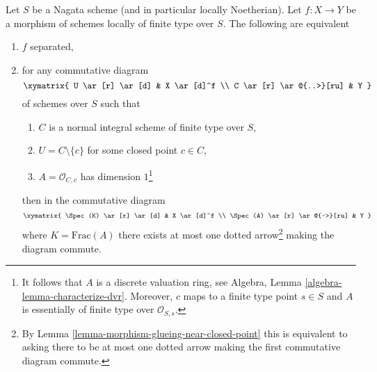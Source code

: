\begin{lemma}
\label{lemma-essentially-finite-type-criterion-separation}
Let $S$ be a Nagata scheme (and in particular locally Noetherian).
Let $f : X \to Y$ be a morphism of schemes locally of finite type over $S$.
The following are equivalent
\begin{enumerate}
\item $f$ separated,
\item for any commutative diagram
$$
\xymatrix{
U \ar[r] \ar[d] & X \ar[d]^f \\
C \ar[r] \ar@{..>}[ru] & Y
}
$$
of schemes over $S$ such that
\begin{enumerate}
\item $C$ is a normal integral scheme of finite type over $S$,
\item $U = C \setminus \{c\}$ for some closed point $c \in C$,
\item $A = \mathcal{O}_{C, c}$ has dimension $1$\footnote{It follows
that $A$ is a discrete valuation ring, see
Algebra, Lemma \ref{algebra-lemma-characterize-dvr}.
Moreover, $c$ maps to a finite type point $s \in S$ and
$A$ is essentially of finite type over $\mathcal{O}_{S, s}$.}
\end{enumerate}
then in the commutative diagram
$$
\xymatrix{
\Spec(K) \ar[r] \ar[d] & X \ar[d]^f \\
\Spec(A) \ar[r] \ar@{-->}[ru] & Y
}
$$
where $K = \text{Frac}(A)$ there exists at most one dotted arrow\footnote{By
Lemma \ref{lemma-morphism-glueing-near-closed-point} this is
equivalent to asking there to be at most one dotted arrow
making the first commutative diagram commute.}
making the diagram commute.
\end{enumerate}
\end{lemma}

